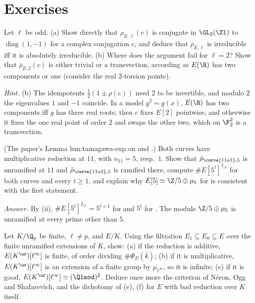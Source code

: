 \section{Exercises}\label{sec:galrep:exercises}

\begin{exercise}\label{ex:galrep:complex-conjugation}
Let $\ell$ be odd. (a) Show directly that $\rho_{E,\ell}(c)$ is conjugate in $\GL_2(\Zl)$ to $\operatorname{diag}(1,-1)$ for a complex conjugation $c$, and deduce that $\bar\rho_{E,\ell}$
is irreducible iff it is absolutely irreducible. (b) Where does the argument fail for $\ell=2$? Show that $\bar\rho_{E,2}(c)$ is either trivial or a transvection,
according as $E(\R)$ has two components or one (consider the real $2$-torsion points).

\emph{Hint.} (b) The idempotents $\frac12(1\pm\rho(c))$ need $2$ to be invertible, and modulo $2$ the eigenvalues $1$ and $-1$ coincide. In a model $y^2=g(x)$,
$E(\R)$ has two components iff $g$ has three real roots; then $c$ fixes $E[2]$ pointwise, and otherwise it fixes the one real point of order $2$ and swaps
the other two, which on $\F_2^2$ is a transvection.
\end{exercise}

\begin{exercise}\label{ex:galrep:eleven-five}
(The paper's Lemma lem:tamagawa-exp on  and .) Both curves have multiplicative reduction at $11$, with $n_{11}=5$, resp.\ $1$. Show that
$\bar\rho_{\curve{11a1},5}$ is unramified at $11$ and $\bar\rho_{\curve{11a3},5}$ is ramified there, compute $\#E[5^t]^{I_{11}}$ for both curves and every $t\ge1$, and explain why
$E[5]\simeq\Z/5\oplus\mu_5$ for  is consistent with the first statement.

\emph{Answer.} By (ii), $\#E[5^t]^{I_{11}}=5^{t+1}$ for  and $5^t$ for . The module $\Z/5\oplus\mu_5$ is unramified at every
prime other than $5$.
\end{exercise}

\begin{exercise}\label{ex:galrep:torsion-ur}
Let $K/\Q_p$ be finite, $\ell\ne p$, and $E/K$. Using the filtration $E_1\subseteq E_0\subseteq E$ over the finite unramified extensions of $K$, show: (a) if the
reduction is additive, $E(K^{\ur})[\ell^\infty]$ is finite, of order dividing $\#\Phi_E(\bar k)$; (b) if it is multiplicative, $E(K^{\ur})[\ell^\infty]$ is an extension of a
finite group by $\mu_{\ell^\infty}$, so it is infinite; (c) if it is good, $E(K^{\ur})[\ell^\infty]\simeq(\Qlmod)^2$. Deduce once more the criterion of N\'eron, Ogg and
Shafarevich, and the dichotomy of (e), (f) for $E$ with bad reduction over $K$ itself.
\end{exercise}

